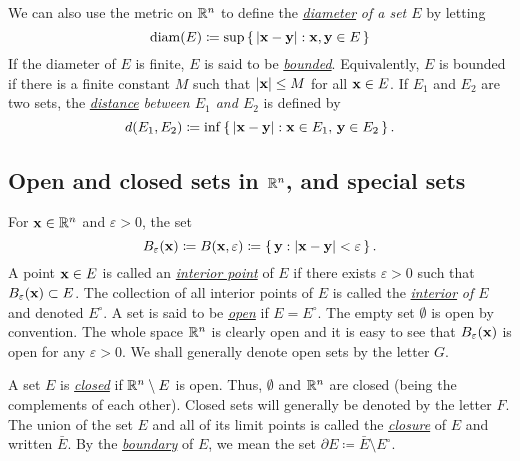 We can also use the metric on $\mathbb{R}^n$ to define the
\href{https://en.wikipedia.org/wiki/Metric_space#Bounded_and_totally_bounded_spaces}{\emph{diameter}}
\emph{of a set $E$} by letting
\begin{equation}
\label{eq:1:diameter}
\operatorname{diam}(E)\coloneqq\sup\left\{\,|\mathbf{x}-\mathbf{y}|:\mathbf{x},\mathbf{y}\in E\,\right\}
\end{equation}
If the diameter of $E$ is finite, $E$ is said to be
\href{https://en.wikipedia.org/wiki/Bounded_set}{\emph{bounded}}. Equivalently,
$E$ is bounded if there is a finite constant $M$ such that $|\mathbf{x}|\leq M$
for all $\mathbf{x}\in E$. If $E_1$ and $E_2$ are two sets, the
\href{https://en.wikipedia.org/wiki/Hausdorff_distance}{\emph{distance}}
\emph{between $E_1$ and $E_2$} is defined by
\begin{equation}
  \label{eq:1:hausdorff-distance}
d(E_1,E_2)\coloneqq\inf\left\{\,|\mathbf{x}-\mathbf{y}|:\text{$\mathbf{x}\in E_1$, $\mathbf{y}\in
    E_2 $}\,\right\}.
\end{equation}

\subsection{Open and closed sets in $\mathbb{R}^n$, and special sets}
For $\mathbf{x}\in\mathbb{R}^n$ and $\varepsilon>0$, the set
\begin{equation}
\label{eq:1:open-ball}
B_\varepsilon(\mathbf{x})\coloneqq
B(\mathbf{x},\varepsilon)\coloneqq\left\{\,\mathbf{y}:|\mathbf{x}-\mathbf{y}|<\varepsilon\,\right\}.
\end{equation}
A point $\mathbf{x}\in E$ is called an
\href{https://en.wikipedia.org/wiki/Interior_(topology)#Interior_point}{\emph{interior
    point}} of $E$ if there exists $\varepsilon>0$ such that
$B_\varepsilon(\mathbf{x})\subset E$. The collection of all interior points of
$E$ is called the
\href{https://en.wikipedia.org/wiki/Interior_(topology)}{\emph{interior}}
\emph{of $E$} and denoted $E^\circ$. A set is said to be
\href{https://en.wikipedia.org/wiki/Open_set}{\emph{open}} if
$E=E^\circ$. The empty set $\emptyset$ is open by convention. The whole
space $\mathbb{R}^n$ is clearly open and it is easy to see that
$B_\varepsilon(\mathbf{x})$ is open for any $\varepsilon>0$. We shall generally
denote open sets by the letter $G$.

A set $E$ is \href{https://en.wikipedia.org/wiki/Closed_set}{\emph{closed}}
if $\mathbb{R}^n\setminus E$ is open. Thus, $\emptyset$ and $\mathbb{R}^n$ are closed
(being the complements of each other). Closed sets will generally be
denoted by the letter $F$. The union of the set $E$ and all of its limit
points is called the
\href{https://en.wikipedia.org/wiki/Closure_(topology)}{\emph{closure}} of
$E$ and written $\bar E$. By the
\href{https://en.wikipedia.org/wiki/Boundary_(topology)}{\emph{boundary}}
of $E$, we mean the set $\partial E\coloneqq \bar E\setminus E^\circ$.

